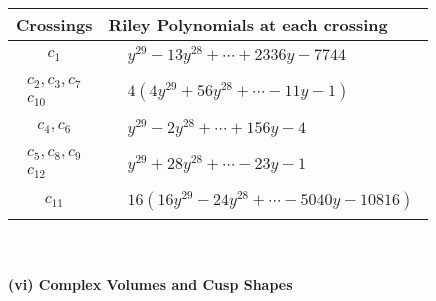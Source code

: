 \documentclass[1p]{elsarticle_modified}
\theoremstyle{definition}
\begin{document}
\begin{tabular}{m{50pt}|m{274pt}}
Crossings & \hspace{64pt}Riley Polynomials at each crossing \\
\hline $$\begin{aligned}c_{1}\end{aligned}$$&$\begin{aligned}
&y^{29}-13 y^{28}+\cdots+2336 y-7744
\end{aligned}$\\
\hline $$\begin{aligned}c_{2},c_{3},c_{7}\\c_{10}\end{aligned}$$&$\begin{aligned}
&4(4 y^{29}+56 y^{28}+\cdots-11 y-1)
\end{aligned}$\\
\hline $$\begin{aligned}c_{4},c_{6}\end{aligned}$$&$\begin{aligned}
&y^{29}-2 y^{28}+\cdots+156 y-4
\end{aligned}$\\
\hline $$\begin{aligned}c_{5},c_{8},c_{9}\\c_{12}\end{aligned}$$&$\begin{aligned}
&y^{29}+28 y^{28}+\cdots-23 y-1
\end{aligned}$\\
\hline $$\begin{aligned}c_{11}\end{aligned}$$&$\begin{aligned}
&16(16 y^{29}-24 y^{28}+\cdots-5040 y-10816)
\end{aligned}$\\
\hline
\end{tabular}\\~\\
\newpage\flushleft \textbf{(vi) Complex Volumes and Cusp Shapes}
\end{document}
